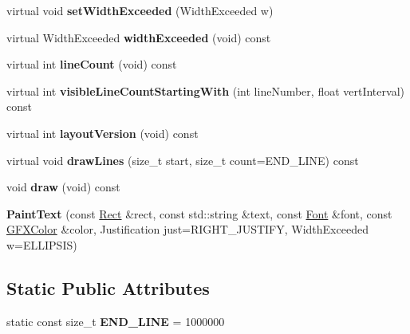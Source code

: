 \begin{DoxyCompactItemize}
\item 
virtual void {\bfseries set\+Width\+Exceeded} (Width\+Exceeded w)\hypertarget{classPaintText_a3a402ec0896b658e22393dd690d194e4}{}\label{classPaintText_a3a402ec0896b658e22393dd690d194e4}

\item 
virtual Width\+Exceeded {\bfseries width\+Exceeded} (void) const \hypertarget{classPaintText_a5ab0eaa1446caa7b5a89c1113f141a94}{}\label{classPaintText_a5ab0eaa1446caa7b5a89c1113f141a94}

\item 
virtual int {\bfseries line\+Count} (void) const \hypertarget{classPaintText_a124aa4fd5ad68348a29293e168b01c8f}{}\label{classPaintText_a124aa4fd5ad68348a29293e168b01c8f}

\item 
virtual int {\bfseries visible\+Line\+Count\+Starting\+With} (int line\+Number, float vert\+Interval) const \hypertarget{classPaintText_af6832609bbd63b945e8406a10db86845}{}\label{classPaintText_af6832609bbd63b945e8406a10db86845}

\item 
virtual int {\bfseries layout\+Version} (void) const \hypertarget{classPaintText_ac79796f1cb7916b0be0c8742f5636149}{}\label{classPaintText_ac79796f1cb7916b0be0c8742f5636149}

\item 
virtual void {\bfseries draw\+Lines} (size\+\_\+t start, size\+\_\+t count=E\+N\+D\+\_\+\+L\+I\+NE) const \hypertarget{classPaintText_af513bfd50616e5a3575cf17cca5e3b51}{}\label{classPaintText_af513bfd50616e5a3575cf17cca5e3b51}

\item 
void {\bfseries draw} (void) const \hypertarget{classPaintText_a01540edb4b17155810e76bfef4a5957b}{}\label{classPaintText_a01540edb4b17155810e76bfef4a5957b}

\item 
{\bfseries Paint\+Text} (const \hyperlink{classRect}{Rect} \&rect, const std\+::string \&text, const \hyperlink{classFont}{Font} \&font, const \hyperlink{structGFXColor}{G\+F\+X\+Color} \&color, Justification just=R\+I\+G\+H\+T\+\_\+\+J\+U\+S\+T\+I\+FY, Width\+Exceeded w=E\+L\+L\+I\+P\+S\+IS)\hypertarget{classPaintText_aec282dbd99bd2982e54b95e6495dab96}{}\label{classPaintText_aec282dbd99bd2982e54b95e6495dab96}

\end{DoxyCompactItemize}
\subsection*{Static Public Attributes}
\begin{DoxyCompactItemize}
\item 
static const size\+\_\+t {\bfseries E\+N\+D\+\_\+\+L\+I\+NE} = 1000000\hypertarget{classPaintText_a964dcc52c68737ea3dcd1679b22c470c}{}\label{classPaintText_a964dcc52c68737ea3dcd1679b22c470c}

\end{DoxyCompactItemize}
